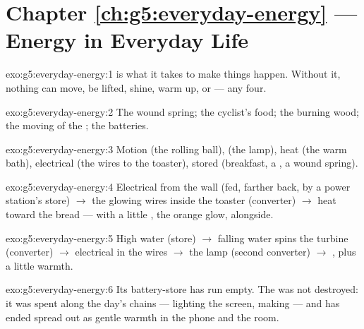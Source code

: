 \section*{Chapter \ref{ch:g5:everyday-energy} --- Energy in Everyday Life}

\begin{solution}{exo:g5:everyday-energy:1}
 is what it takes to make things happen. Without it, nothing
can move, be lifted, shine, warm up, or  --- any four.
\end{solution}

\begin{solution}{exo:g5:everyday-energy:2}
The wound spring; the cyclist's food; the burning wood; the moving
 of the ; the batteries.
\end{solution}

\begin{solution}{exo:g5:everyday-energy:3}
Motion (the rolling ball),  (the lamp), heat (the warm bath),
electrical (the wires to the toaster), stored (breakfast, a
, a wound spring).
\end{solution}

\begin{solution}{exo:g5:everyday-energy:4}
Electrical  from the wall (fed, farther back, by a power
station's store) $\to$ the glowing wires inside the toaster
(converter) $\to$ heat toward the bread --- with a little ,
the orange glow, alongside.
\end{solution}

\begin{solution}{exo:g5:everyday-energy:5}
High water (store) $\to$ falling water spins the turbine
(converter) $\to$ electrical  in the wires $\to$ the lamp
(second converter) $\to$ , plus a little warmth.
\end{solution}

\begin{solution}{exo:g5:everyday-energy:6}
Its battery-store has run empty. The  was not destroyed: it
was spent along the day's chains --- lighting the screen, making
 --- and has ended spread out as gentle warmth in the phone
and the room.
\end{solution}

